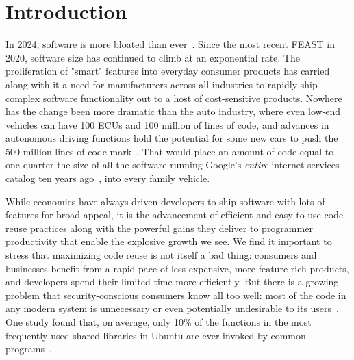 \documentclass[sigconf]{acmart}
\begin{document}


\maketitle

\section{Introduction}
In 2024, software is more bloated than ever~\cite{hubert2024}.  Since the
most recent FEAST in 2020, software size has continued to climb at an
exponential rate. The proliferation of "smart" features into everyday consumer
products has carried along with it a need for manufacturers across all
industries to rapidly ship complex software functionality out to a host of
cost-sensitive products. Nowhere has the change been more dramatic than the auto
industry, where even low-end vehicles can have 100 ECUs and 100 million of lines
of code, and advances in autonomous driving functions hold the potential for
some new cars to push the 500 million lines of code mark~\cite{charette2021}.
That would place an amount of code equal to one quarter the size of all the
software running Google's \emph{entire} internet services catalog ten years
ago~\cite{potvin2015}, into every family vehicle.

While economics have always driven developers to ship software with lots of
features for broad appeal, it is the advancement of efficient and easy-to-use
code reuse practices along with the powerful gains they deliver to programmer
productivity that enable the explosive growth we see.  We find it important to
stress that maximizing code reuse is not itself a bad thing: consumers and
businesses benefit from a rapid pace of less expensive, more feature-rich
products, and developers spend their limited time more efficiently.  But there
is a growing problem that security-conscious consumers know all too well: most
of the code in any modern system is unnecessary or even potentially undesirable
to its users~\cite{quach2017}.  One study found that, on average, only 10\% of
the functions in the most frequently used shared libraries in Ubuntu are ever
invoked by common programs~\cite{quach2018}.
\end{document}
